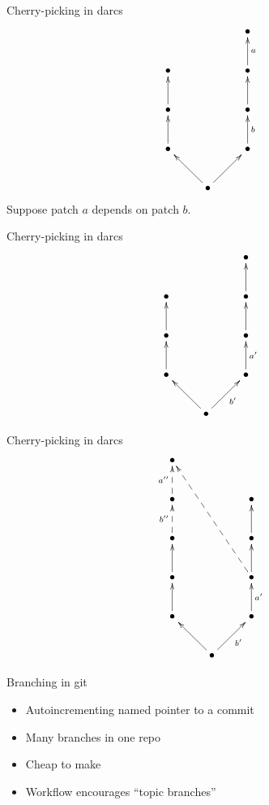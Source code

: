 \documentclass[pdf]{prosper}
\begin{document}


\begin{slide}{Cherry-picking in darcs}
\[
\xymatrix{
	&& \bullet \\
	\bullet && \bullet \ar[u]_a \\
	\bullet \ar[u] && \bullet \ar[u] \\
	\bullet \ar[u] && \bullet \ar[u]_b \\
	& \bullet \ar[ul] \ar[ur]
}
\]
Suppose patch $a$ depends on patch $b$.
\end{slide}

\begin{slide}{Cherry-picking in darcs}
\[
\xymatrix{
	&& \bullet \\
	\bullet && \bullet \ar[u] \\
	\bullet \ar[u] && \bullet \ar[u]_{} \\
	\bullet \ar[u] && \bullet \ar[u]_{a'} \\
	& \bullet \ar[ul] \ar[ur]_{b'}
}
\]
\end{slide}

\begin{slide}{Cherry-picking in darcs}
\[
\xymatrix{
	\bullet \\
	\bullet \ar@{-->}[u]^{a''} && \bullet \\
	\bullet \ar@{-->}[u]^{b''} && \bullet \ar[u] \\
	\bullet \ar[u] && \bullet \ar[u] \ar@{-->}[uuull] \\
	\bullet \ar[u] && \bullet \ar[u]_{a'} \\
	& \bullet \ar[ul] \ar[ur]_{b'}
}
\]
\end{slide}


\begin{slide}{Branching in git}
\begin{itemize}
\item Autoincrementing named pointer to a commit
\item Many branches in one repo
\item Cheap to make
\item Workflow encourages ``topic branches''
\end{itemize}
\end{slide}
\end{document}
